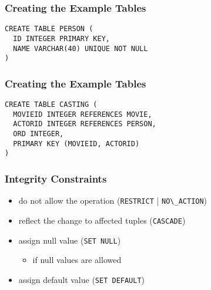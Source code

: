 \documentclass[dvipsnames]{beamer}
\theoremstyle{plain}
\begin{document}
\begin{frame}[fragile]
  \frametitle{Creating the Example Tables}

  \begin{example}
    \begin{lstlisting}
CREATE TABLE PERSON (
  ID INTEGER PRIMARY KEY,
  NAME VARCHAR(40) UNIQUE NOT NULL
)
    \end{lstlisting}
  \end{example}
\end{frame}

\begin{frame}[fragile]
  \frametitle{Creating the Example Tables}

  \begin{example}
    \begin{lstlisting}
CREATE TABLE CASTING (
  MOVIEID INTEGER REFERENCES MOVIE,
  ACTORID INTEGER REFERENCES PERSON,
  ORD INTEGER,
  PRIMARY KEY (MOVIEID, ACTORID)
)
    \end{lstlisting}
  \end{example}
\end{frame}

\begin{frame}
  \frametitle{Integrity Constraints}

  \begin{itemize}
    \item do not allow the operation
      (\lstinline!RESTRICT! | \lstinline!NO\_ACTION!)

    \pause
    \item reflect the change to affected tuples (\lstinline!CASCADE!)

    \pause
    \item assign null value (\lstinline!SET NULL!)
    \begin{itemize}
      \item if null values are allowed
    \end{itemize}

    \pause
    \item assign default value (\lstinline!SET DEFAULT!)
  \end{itemize}
\end{frame}
\end{document}
